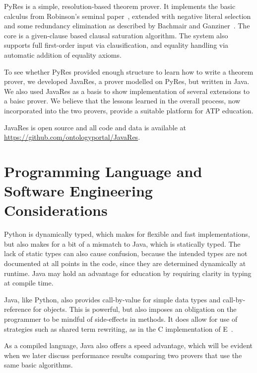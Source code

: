 \documentclass{llncs}
\begin{document}
PyRes is a simple, resolution-based theorem prover. It implements the
basic calculus from Robinson's seminal paper~\cite{Ro65}, extended
with negative literal selection and some redundancy elimination as
described by Bachmair and Ganziner~\cite{BG:HBAR-2001}. The core is a
given-clause based clausal saturation algorithm. The system also
supports full first-order input via clausification, and equality
handling via automatic addition of equality axioms.

To see whether PyRes provided enough structure to learn how to write a
theorem prover, we developed JavaRes, a prover modelled on PyRes, but
written in Java. We also used JavaRes as a basis to show implementation of several
extensions to a baisc prover.  We believe that the lessons learned in the overall
process, now incorporated into the two provers, provide a suitable
platform for ATP education.

JavaRes is open source and all code and data is available at
\url{https://github.com/ontologyportal/JavaRes}.




\section{Programming Language and Software Engineering Considerations}

Python is dynamically typed, which makes for flexible and fast
implementations, but also makes for a bit of a mismatch to Java, which
is statically typed.  The lack of static types can also cause
confusion, because the intended types are not documented at all points
in the code, since they are determined dynamically at runtime.  Java
may hold an advantage for education by requiring clarity in typing at
compile time.

Java, like Python, also provides call-by-value for simple data types
and call-by-reference for objects.  This is powerful, but also imposes
an obligation on the programmer to be mindful of side-effects in
methods.  It does allow for use of strategies such as shared term
rewriting, as in the C implementation of E~\cite{LS:LPAR-WS-2001}.

As a compiled language, Java also offers a speed advantage, which will
be evident when we later discuss performance results comparing two
provers that use the same basic algorithms.
\end{document}
